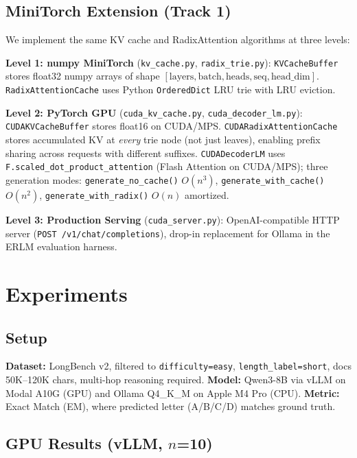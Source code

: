 \documentclass{article}
\begin{document}
\subsection{MiniTorch Extension (Track 1)}
We implement the same KV cache and RadixAttention algorithms at three levels:

\textbf{Level 1: numpy MiniTorch} (\texttt{kv\_cache.py}, \texttt{radix\_trie.py}): \texttt{KVCacheBuffer} stores float32 numpy arrays of shape $[\text{layers}, \text{batch}, \text{heads}, \text{seq}, \text{head\_dim}]$. \texttt{RadixAttentionCache} uses Python \texttt{OrderedDict} LRU trie with LRU eviction.

\textbf{Level 2: PyTorch GPU} (\texttt{cuda\_kv\_cache.py}, \texttt{cuda\_decoder\_lm.py}): \texttt{CUDAKVCacheBuffer} stores float16 on CUDA/MPS. \texttt{CUDARadixAttentionCache} stores accumulated KV at \emph{every} trie node (not just leaves), enabling prefix sharing across requests with different suffixes. \texttt{CUDADecoderLM} uses \texttt{F.scaled\_dot\_product\_attention} (Flash Attention on CUDA/MPS); three generation modes: \texttt{generate\_no\_cache()} $O(n^3)$, \texttt{generate\_with\_cache()} $O(n^2)$, \texttt{generate\_with\_radix()} $O(n)$ amortized.

\textbf{Level 3: Production Serving} (\texttt{cuda\_server.py}): OpenAI-compatible HTTP server (\texttt{POST /v1/chat/completions}), drop-in replacement for Ollama in the ERLM evaluation harness.

\section{Experiments}

\subsection{Setup}
\textbf{Dataset:} LongBench v2, filtered to \texttt{difficulty=easy}, \texttt{length\_label=short}, docs 50K--120K chars, multi-hop reasoning required.
\textbf{Model:} Qwen3-8B via vLLM on Modal A10G (GPU) and Ollama Q4\_K\_M on Apple M4 Pro (CPU).
\textbf{Metric:} Exact Match (EM), where predicted letter (A/B/C/D) matches ground truth.

\subsection{GPU Results (vLLM, $n$=10)}
\end{document}

